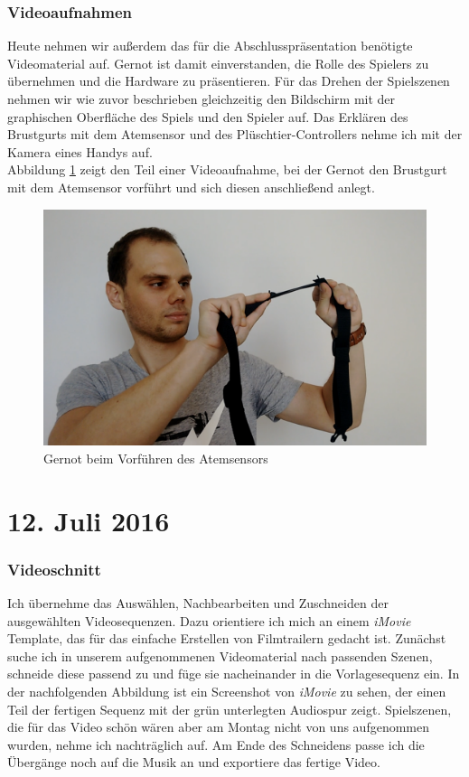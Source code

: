 \documentclass{report}
\begin{document}
\subsubsection*{Videoaufnahmen}

Heute nehmen wir außerdem das für die Abschlusspräsentation benötigte Videomaterial auf. Gernot ist damit einverstanden, die Rolle des Spielers zu übernehmen und die Hardware zu präsentieren. Für das Drehen der Spielszenen nehmen wir wie zuvor beschrieben gleichzeitig den Bildschirm mit der graphischen Oberfläche des Spiels und den Spieler auf. Das Erklären des Brustgurts mit dem Atemsensor und des Plüschtier-Controllers nehme ich mit der Kamera eines Handys auf. \\

\noindent Abbildung \ref{fig:video} zeigt den Teil einer Videoaufnahme, bei der Gernot den Brustgurt mit dem Atemsensor vorführt und sich diesen anschließend anlegt.

\begin{figure}
	\includegraphics[width=120mm]{img/video}
	\caption{Gernot beim Vorführen des Atemsensors}
	\label{fig:video}
\end{figure}



\section*{12. Juli 2016}

\subsubsection*{Videoschnitt}

Ich übernehme das Auswählen, Nachbearbeiten und Zuschneiden der ausgewählten Videosequenzen. Dazu orientiere ich mich an einem \textit{iMovie} Template, das für das einfache Erstellen von Filmtrailern gedacht ist. Zunächst suche ich in unserem aufgenommenen Videomaterial nach passenden Szenen, schneide diese passend zu und füge sie nacheinander in die Vorlagesequenz ein. In der nachfolgenden Abbildung ist ein Screenshot von \textit{iMovie} zu sehen, der einen Teil der fertigen Sequenz mit der grün unterlegten Audiospur zeigt. Spielszenen, die für das Video schön wären aber am Montag nicht von uns aufgenommen wurden, nehme ich nachträglich auf. Am Ende des Schneidens passe ich die Übergänge noch auf die Musik an und exportiere das fertige Video.
\end{document}

